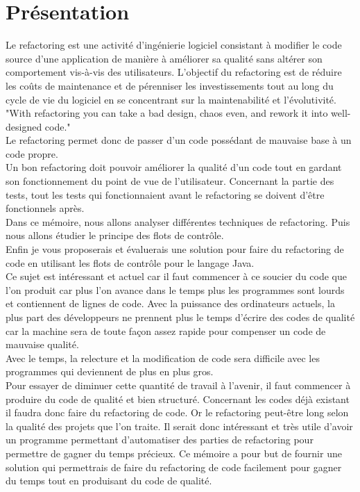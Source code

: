 \documentclass[a4paper,twoside,12pt,openright]{report}
\begin{document}
\section{Présentation}
Le refactoring est une activité d'ingénierie logiciel consistant à modifier le code source d'une application de manière à améliorer sa qualité sans altérer son comportement vis-à-vis des utilisateurs.
L'objectif du refactoring est de réduire les coûts de maintenance et de pérenniser les investissements tout au long du cycle de vie du logiciel en se concentrant sur la maintenabilité et l'évolutivité.\cite{ref1}\\
"With refactoring you can take a bad design, chaos even, and rework it into well-designed code."\cite{ref2}\\
Le refactoring permet donc de passer d'un code possédant de mauvaise base à un code propre.\\
Un bon refactoring doit pouvoir améliorer la qualité d'un code tout en gardant son fonctionnement du point de vue de l'utilisateur. Concernant la partie des tests, tout les tests qui fonctionnaient avant le refactoring se doivent d'être fonctionnels après.\\
Dans ce mémoire, nous allons analyser différentes techniques de refactoring. Puis nous allons étudier le principe des flots de contrôle.\\ Enfin je vous proposerais et évaluerais une solution pour faire du refactoring de code en utilisant les flots de contrôle pour le langage Java.\\
Ce sujet est intéressant et actuel car il faut commencer à ce soucier du code que l'on produit car plus l'on avance dans le temps plus les programmes sont lourds et contiennent de lignes de code. Avec la puissance des ordinateurs actuels, la plus part des développeurs ne prennent plus le temps d'écrire des codes de qualité car la machine sera de toute façon assez rapide pour compenser un code de mauvaise qualité.\cite{ref4}\\
Avec le temps, la relecture et la modification de code sera difficile avec les programmes qui deviennent de plus en plus gros.\cite{ref4}\\
Pour essayer de diminuer cette quantité de travail à l'avenir, il faut commencer à produire du code de qualité et bien structuré. Concernant les codes déjà existant il faudra donc faire du refactoring de code. Or le refactoring peut-être long selon la qualité des projets que l'on traite. Il serait donc intéressant et très utile d'avoir un programme permettant d'automatiser des parties de refactoring pour permettre de gagner du temps précieux. 
Ce mémoire a pour but de fournir une solution qui permettrais de faire du refactoring de code facilement pour gagner du temps tout en produisant du code de qualité.


\end{document}
